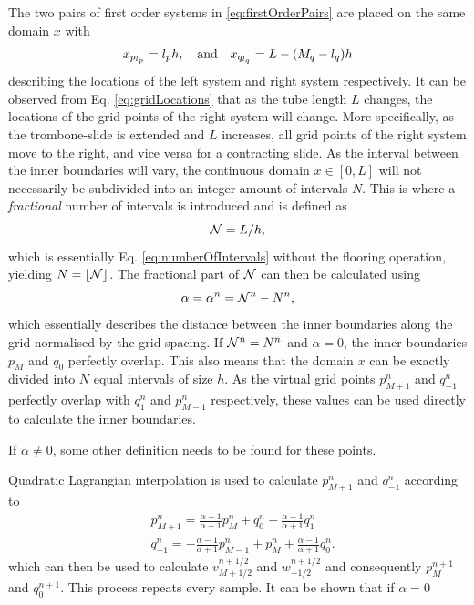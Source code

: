 The two pairs of first order systems in \eqref{eq:firstOrderPairs} are placed on the same domain $x$ with
\begin{equation}\label{eq:gridLocations}
    x_{p_{l_p}} = {l_p} h, \quad \text{and}\quad
    x_{q_{l_q}} = L-(M_q - {l_q})h
\end{equation}
describing the locations of the left system and right system respectively. It can be observed from Eq. \eqref{eq:gridLocations} that as the tube length $L$ changes, the locations of the grid points of the right system will change. More specifically, as the trombone-slide is extended and $L$ increases, all grid points of the right system move to the right, and vice versa for a contracting slide. As the interval between the inner boundaries will vary, the continuous domain $x \in [0,L]$ will not necessarily be subdivided into an integer amount of intervals $N$. This is where a \textit{fractional} number of intervals is introduced and is defined as \begin{equation}
    \mathcal{N} = L/h,
\end{equation}
which is essentially Eq. \eqref{eq:numberOfIntervals} without the flooring operation, yielding $N = \lfloor \mathcal{N} \rfloor$. The fractional part of $\mathcal{N}$ can then be calculated using
\begin{equation}\label{eq:alphaDef}
    \alpha = \alpha^n = \mathcal{N}^n - N^n,
\end{equation}
which essentially describes the distance between the inner boundaries along the grid normalised by the grid spacing. If $\mathcal{N}^n = N^n$ and $\alpha = 0$, the inner boundaries $p_M$ and $q_0$ perfectly overlap. This also means that the domain $x$ can be exactly divided into $N$ equal intervals of size $h$. As the virtual grid points $p_{M+1}^n$ and $q_{-1}^n$ perfectly overlap with $q_{1}^n$ and $p_{M-1}^n$ respectively, these values can be used directly to calculate the inner boundaries.

If $\alpha \neq 0$, some other definition needs to be found for these points. 

Quadratic Lagrangian interpolation is used to calculate $p_{M+1}^n$ and $q_{-1}^n$ according to
\begin{subequations}\label{eq:connectionInterpol}
\begin{align}
        &p_{M+1}^n = \frac{\alpha - 1}{\alpha + 1}p_{M}^n + q_0^n - \frac{\alpha - 1}{\alpha + 1}q_1^n
    \label{eq:calcPMp1}\\
        &q_{-1}^n
        =-\frac{\alpha - 1}{\alpha + 1}p_{M-1}^n + p_{M}^n+ \frac{\alpha - 1}{\alpha + 1}q_{0}^n.\label{eq:calcQm1}
\end{align}
\end{subequations}
which can then be used to calculate $v_{M+1/2}^{n+1/2}$ and $w_{-1/2}^{n+1/2}$ and consequently $p_M^{n+1}$ and $q_0^{n+1}$. This process repeats every sample. It can be shown that if $\alpha=0$





